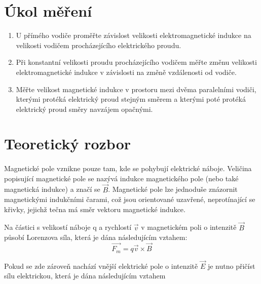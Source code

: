 \documentclass{praktikum}
\begin{document}
\maketitle
\vspace{0.5 cm}


\section{Úkol měření}
\begin{enumerate}
\item U přímého vodiče proměřte závislost velikosti elektromagnetické indukce na velikosti vodičem procházejícího elektrického proudu.
\item Při konstantní velikosti proudu procházejícího vodičem měřte změnu velikosti elektromagnetické indukce v závislosti na změně vzdálenosti
od vodiče.
\item Měřte velikost magnetické indukce v prostoru mezi dvěma paralelními
vodiči, kterými protéká elektrický proud stejným směrem a kterými poté protéká elektrický proud směry navzájem opačnými.

\end{enumerate}
\section{Teoretický rozbor}
\paragraph{}
Magnetické pole vznikne pouze tam, kde se pohybují elektrické náboje. Veličina popisující magnetické pole se nazývá indukce magnetického pole (nebo také magnetická indukce) a značí se $\vec{B}$. Magnetické pole lze jednoduše znázornit magnetickými indukčními čarami, což jsou orientované uzavřené, neprotínající se křivky, jejichž tečna má směr vektoru magnetické indukce. 

\indent Na částici s velikostí náboje q a rychlostí $\vec{v}$ v magnetickém poli o intenzitě $\vec{B}$ působí Lorenzova síla, která je dána následujícím vztahem:
\begin{equation}
\label{eqn:lorenz_force}
\vec{F_m}=q\vec{v}\times\vec{B}
\end{equation} 

Pokud se zde zároveň nachází vnější elektrické pole o intenzitě $\vec{E}$ je nutno přičíst sílu elektrickou, která je dána následujícím vztahem
\end{document}
